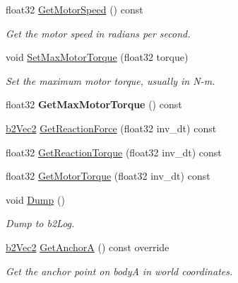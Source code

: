 \begin{DoxyCompactItemize}
\mbox{\label{classb2RevoluteJoint_abb1fa43d5779a1164ddfedf6130d7ff2}} 
float32 \hyperlink{classb2RevoluteJoint_abb1fa43d5779a1164ddfedf6130d7ff2}{Get\+Motor\+Speed} () const
\begin{DoxyCompactList}\small\item\em Get the motor speed in radians per second. \end{DoxyCompactList}\item 
\mbox{\label{classb2RevoluteJoint_a41779d7ec05be33e6368ef00123a3581}} 
void \hyperlink{classb2RevoluteJoint_a41779d7ec05be33e6368ef00123a3581}{Set\+Max\+Motor\+Torque} (float32 torque)
\begin{DoxyCompactList}\small\item\em Set the maximum motor torque, usually in N-\/m. \end{DoxyCompactList}\item 
\mbox{\label{classb2RevoluteJoint_a878308eb3e299e15ac9dc88d48671d51}} 
float32 {\bfseries Get\+Max\+Motor\+Torque} () const
\item 
\hyperlink{structb2Vec2}{b2\+Vec2} \hyperlink{classb2RevoluteJoint_a75d097d273af5f15994cfa5109039ac6}{Get\+Reaction\+Force} (float32 inv\+\_\+dt) const
\item 
float32 \hyperlink{classb2RevoluteJoint_af068e495214c92316d02130ba0a568b7}{Get\+Reaction\+Torque} (float32 inv\+\_\+dt) const
\item 
float32 \hyperlink{classb2RevoluteJoint_a5abafb4d0c1df642f73a5d9faf615e26}{Get\+Motor\+Torque} (float32 inv\+\_\+dt) const
\item 
\mbox{\label{classb2RevoluteJoint_aa9d88f5476c77a5c4a6ef5b2ad0d3e6f}} 
void \hyperlink{classb2RevoluteJoint_aa9d88f5476c77a5c4a6ef5b2ad0d3e6f}{Dump} ()
\begin{DoxyCompactList}\small\item\em Dump to b2\+Log. \end{DoxyCompactList}\item 
\mbox{\label{classb2RevoluteJoint_a9878591c460a4e1575f8a77c237608ae}} 
\hyperlink{structb2Vec2}{b2\+Vec2} \hyperlink{classb2RevoluteJoint_a9878591c460a4e1575f8a77c237608ae}{Get\+AnchorA} () const override
\begin{DoxyCompactList}\small\item\em Get the anchor point on bodyA in world coordinates. \end{DoxyCompactList}\item 

\end{DoxyCompactItemize}
